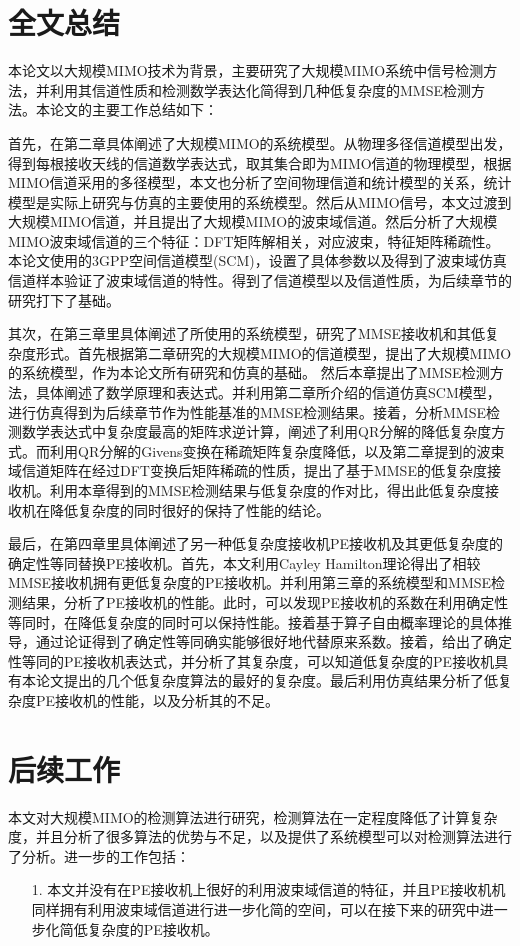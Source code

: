 \documentclass[bachelor,nocolorlinks, printoneside]{seuthesis} %
\begin{document}
\begin{Main}
\section{全文总结}
本论文以大规模MIMO技术为背景，主要研究了大规模MIMO系统中信号检测方法，并利用其信道性质和检测数学表达化简得到几种低复杂度的MMSE检测方法。本论文的主要工作总结如下：

首先，在第二章具体阐述了大规模MIMO的系统模型。从物理多径信道模型出发，得到每根接收天线的信道数学表达式，取其集合即为MIMO信道的物理模型，根据MIMO信道采用的多径模型，本文也分析了空间物理信道和统计模型的关系，统计模型是实际上研究与仿真的主要使用的系统模型。然后从MIMO信号，本文过渡到大规模MIMO信道，并且提出了大规模MIMO的波束域信道。然后分析了大规模MIMO波束域信道的三个特征：DFT矩阵解相关，对应波束，特征矩阵稀疏性。本论文使用的3GPP空间信道模型(SCM)，设置了具体参数以及得到了波束域仿真信道样本验证了波束域信道的特性。得到了信道模型以及信道性质，为后续章节的研究打下了基础。

其次，在第三章里具体阐述了所使用的系统模型，研究了MMSE接收机和其低复杂度形式。首先根据第二章研究的大规模MIMO的信道模型，提出了大规模MIMO的系统模型，作为本论文所有研究和仿真的基础。
然后本章提出了MMSE检测方法，具体阐述了数学原理和表达式。并利用第二章所介绍的信道仿真SCM模型，进行仿真得到为后续章节作为性能基准的MMSE检测结果。接着，分析MMSE检测数学表达式中复杂度最高的矩阵求逆计算，阐述了利用QR分解的降低复杂度方式。而利用QR分解的Givens变换在稀疏矩阵复杂度降低，以及第二章提到的波束域信道矩阵在经过DFT变换后矩阵稀疏的性质，提出了基于MMSE的低复杂度接收机。利用本章得到的MMSE检测结果与低复杂度的作对比，得出此低复杂度接收机在降低复杂度的同时很好的保持了性能的结论。

最后，在第四章里具体阐述了另一种低复杂度接收机PE接收机及其更低复杂度的确定性等同替换PE接收机。首先，本文利用Cayley Hamilton理论得出了相较MMSE接收机拥有更低复杂度的PE接收机。并利用第三章的系统模型和MMSE检测结果，分析了PE接收机的性能。此时，可以发现PE接收机的系数在利用确定性等同时，在降低复杂度的同时可以保持性能。接着基于算子自由概率理论的具体推导，通过论证得到了确定性等同确实能够很好地代替原来系数。接着，给出了确定性等同的PE接收机表达式，并分析了其复杂度，可以知道低复杂度的PE接收机具有本论文提出的几个低复杂度算法的最好的复杂度。最后利用仿真结果分析了低复杂度PE接收机的性能，以及分析其的不足。

\section{后续工作}
本文对大规模MIMO的检测算法进行研究，检测算法在一定程度降低了计算复杂度，并且分析了很多算法的优势与不足，以及提供了系统模型可以对检测算法进行了分析。进一步的工作包括：
\begin{itemize}
\item[1.]本文并没有在PE接收机上很好的利用波束域信道的特征，并且PE接收机机同样拥有利用波束域信道进行进一步化简的空间，可以在接下来的研究中进一步化简低复杂度的PE接收机。


\end{itemize}
\end{Main}
\end{document}
